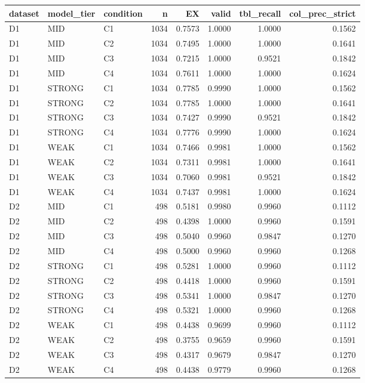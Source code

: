 \begin{tabular}{lllrrrrr}
\toprule
dataset & model\_tier & condition & n & EX & valid & tbl\_recall & col\_prec\_strict \\
\midrule
D1 & MID & C1 & 1034 & 0.7573 & 1.0000 & 1.0000 & 0.1562 \\
D1 & MID & C2 & 1034 & 0.7495 & 1.0000 & 1.0000 & 0.1641 \\
D1 & MID & C3 & 1034 & 0.7215 & 1.0000 & 0.9521 & 0.1842 \\
D1 & MID & C4 & 1034 & 0.7611 & 1.0000 & 1.0000 & 0.1624 \\
D1 & STRONG & C1 & 1034 & 0.7785 & 0.9990 & 1.0000 & 0.1562 \\
D1 & STRONG & C2 & 1034 & 0.7785 & 1.0000 & 1.0000 & 0.1641 \\
D1 & STRONG & C3 & 1034 & 0.7427 & 0.9990 & 0.9521 & 0.1842 \\
D1 & STRONG & C4 & 1034 & 0.7776 & 0.9990 & 1.0000 & 0.1624 \\
D1 & WEAK & C1 & 1034 & 0.7466 & 0.9981 & 1.0000 & 0.1562 \\
D1 & WEAK & C2 & 1034 & 0.7311 & 0.9981 & 1.0000 & 0.1641 \\
D1 & WEAK & C3 & 1034 & 0.7060 & 0.9981 & 0.9521 & 0.1842 \\
D1 & WEAK & C4 & 1034 & 0.7437 & 0.9981 & 1.0000 & 0.1624 \\
D2 & MID & C1 & 498 & 0.5181 & 0.9980 & 0.9960 & 0.1112 \\
D2 & MID & C2 & 498 & 0.4398 & 1.0000 & 0.9960 & 0.1591 \\
D2 & MID & C3 & 498 & 0.5040 & 0.9960 & 0.9847 & 0.1270 \\
D2 & MID & C4 & 498 & 0.5000 & 0.9960 & 0.9960 & 0.1268 \\
D2 & STRONG & C1 & 498 & 0.5281 & 1.0000 & 0.9960 & 0.1112 \\
D2 & STRONG & C2 & 498 & 0.4418 & 1.0000 & 0.9960 & 0.1591 \\
D2 & STRONG & C3 & 498 & 0.5341 & 1.0000 & 0.9847 & 0.1270 \\
D2 & STRONG & C4 & 498 & 0.5321 & 1.0000 & 0.9960 & 0.1268 \\
D2 & WEAK & C1 & 498 & 0.4438 & 0.9699 & 0.9960 & 0.1112 \\
D2 & WEAK & C2 & 498 & 0.3755 & 0.9659 & 0.9960 & 0.1591 \\
D2 & WEAK & C3 & 498 & 0.4317 & 0.9679 & 0.9847 & 0.1270 \\
D2 & WEAK & C4 & 498 & 0.4438 & 0.9779 & 0.9960 & 0.1268 \\
\bottomrule
\end{tabular}
